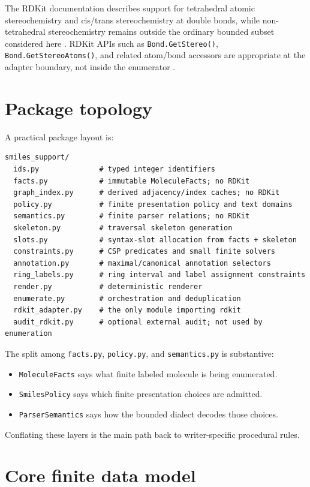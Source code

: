 \documentclass[10pt,a4paper]{article}
\theoremstyle{definition}
\theoremstyle{remark}
\begin{document}
The RDKit documentation describes support for tetrahedral atomic stereochemistry
and cis/trans stereochemistry at double bonds, while non-tetrahedral
stereochemistry remains outside the ordinary bounded subset considered here
\cite{rdkit-book-stereo}.  RDKit APIs such as \texttt{Bond.GetStereo()},
\texttt{Bond.GetStereoAtoms()}, and related atom/bond accessors are appropriate
at the adapter boundary, not inside the enumerator \cite{rdkit-rdchem}.

\section{Package topology}
\label{s:topology}

A practical package layout is:

\begin{lstlisting}
smiles_support/
  ids.py              # typed integer identifiers
  facts.py            # immutable MoleculeFacts; no RDKit
  graph_index.py      # derived adjacency/index caches; no RDKit
  policy.py           # finite presentation policy and text domains
  semantics.py        # finite parser relations; no RDKit
  skeleton.py         # traversal skeleton generation
  slots.py            # syntax-slot allocation from facts + skeleton
  constraints.py      # CSP predicates and small finite solvers
  annotation.py       # maximal/canonical annotation selectors
  ring_labels.py      # ring interval and label assignment constraints
  render.py           # deterministic renderer
  enumerate.py        # orchestration and deduplication
  rdkit_adapter.py    # the only module importing rdkit
  audit_rdkit.py      # optional external audit; not used by enumeration
\end{lstlisting}

The split among \texttt{facts.py}, \texttt{policy.py}, and
\texttt{semantics.py} is substantive:
\begin{itemize}[leftmargin=*]
\item \texttt{MoleculeFacts} says what finite labeled molecule is being
      enumerated.
\item \texttt{SmilesPolicy} says which finite presentation choices are admitted.
\item \texttt{ParserSemantics} says how the bounded dialect decodes those
      choices.
\end{itemize}
Conflating these layers is the main path back to writer-specific procedural
rules.

\section{Core finite data model}
\label{s:data-model}
\end{document}
